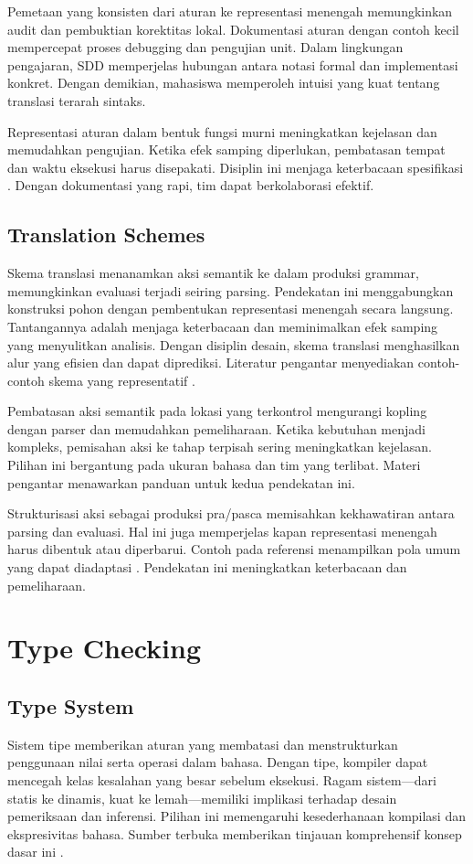 \documentclass[../main.tex]{subfiles}
\begin{document}
Pemetaan yang konsisten dari aturan ke representasi menengah memungkinkan audit dan pembuktian korektitas lokal. Dokumentasi aturan dengan contoh kecil mempercepat proses debugging dan pengujian unit. Dalam lingkungan pengajaran, SDD memperjelas hubungan antara notasi formal dan implementasi konkret. Dengan demikian, mahasiswa memperoleh intuisi yang kuat tentang translasi terarah sintaks.

Representasi aturan dalam bentuk fungsi murni meningkatkan kejelasan dan memudahkan pengujian. Ketika efek samping diperlukan, pembatasan tempat dan waktu eksekusi harus disepakati. Disiplin ini menjaga keterbacaan spesifikasi \citep{WikiSDT}. Dengan dokumentasi yang rapi, tim dapat berkolaborasi efektif.

\subsection{Translation Schemes}
Skema translasi menanamkan aksi semantik ke dalam produksi grammar, memungkinkan evaluasi terjadi seiring parsing. Pendekatan ini menggabungkan konstruksi pohon dengan pembentukan representasi menengah secara langsung. Tantangannya adalah menjaga keterbacaan dan meminimalkan efek samping yang menyulitkan analisis. Dengan disiplin desain, skema translasi menghasilkan alur yang efisien dan dapat diprediksi. Literatur pengantar menyediakan contoh-contoh skema yang representatif \citep{WikiSDT}.

Pembatasan aksi semantik pada lokasi yang terkontrol mengurangi kopling dengan parser dan memudahkan pemeliharaan. Ketika kebutuhan menjadi kompleks, pemisahan aksi ke tahap terpisah sering meningkatkan kejelasan. Pilihan ini bergantung pada ukuran bahasa dan tim yang terlibat. Materi pengantar menawarkan panduan untuk kedua pendekatan ini.

Strukturisasi aksi sebagai produksi pra/pasca memisahkan kekhawatiran antara parsing dan evaluasi. Hal ini juga memperjelas kapan representasi menengah harus dibentuk atau diperbarui. Contoh pada referensi menampilkan pola umum yang dapat diadaptasi \citep{WikiSDT}. Pendekatan ini meningkatkan keterbacaan dan pemeliharaan.

\section{Type Checking}
\subsection{Type System}
Sistem tipe memberikan aturan yang membatasi dan menstrukturkan penggunaan nilai serta operasi dalam bahasa. Dengan tipe, kompiler dapat mencegah kelas kesalahan yang besar sebelum eksekusi. Ragam sistem—dari statis ke dinamis, kuat ke lemah—memiliki implikasi terhadap desain pemeriksaan dan inferensi. Pilihan ini memengaruhi kesederhanaan kompilasi dan ekspresivitas bahasa. Sumber terbuka memberikan tinjauan komprehensif konsep dasar ini \citep{WikiTypeSystem}.
\end{document}
